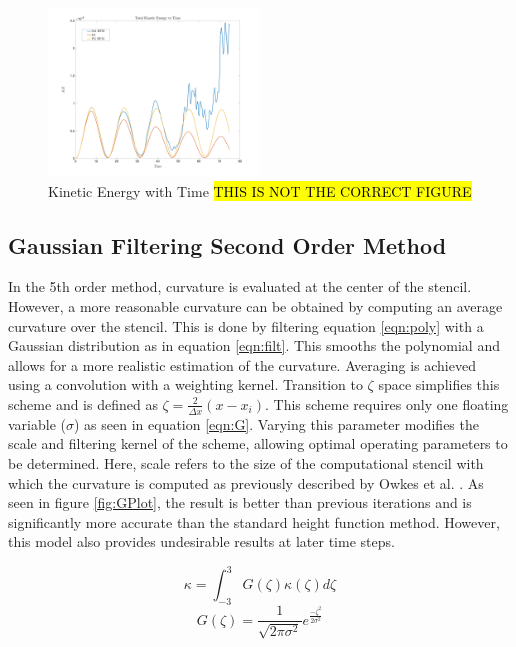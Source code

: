 \begin{figure}[h]
	\centering
	\includegraphics[width=0.5\textwidth]{figs/KEvT}
	\caption{Kinetic Energy with Time \hl{THIS IS NOT THE CORRECT FIGURE}}
	\label{fig:2ndKE}
\end{figure}


\subsection{Gaussian Filtering Second Order Method}

In the 5th order method, curvature is evaluated at the center of the stencil. However, a more reasonable curvature can be obtained by computing an average curvature over the stencil. This is done by filtering equation \ref{eqn:poly} with a Gaussian distribution as in equation \ref{eqn:filt}. This smooths the polynomial and allows for a more realistic estimation of the curvature. Averaging is achieved using a convolution with a weighting kernel. Transition to $\zeta$ space simplifies this scheme and is defined as $\zeta = \frac{2}{\Delta x}(x-x_i)$. This scheme requires only one floating variable ($\sigma$) as seen in equation \ref{eqn:G}. Varying this parameter modifies the scale and filtering kernel of the scheme, allowing optimal operating parameters to be determined. Here, scale refers to the size of the computational stencil with which the curvature is computed as previously described by Owkes et al. \cite{Owkes2018}. As seen in figure \ref{fig:GPlot}, the result is better than previous iterations and is significantly more accurate than the standard height function method. However, this model also provides undesirable results at later time steps.     

\vspace{-0.2in}
\begin{equation}
\kappa = \int_{-3}^{3} G(\zeta) \kappa(\zeta) d\zeta
\label{eqn:filt}
\end{equation} 
\begin{equation}
G(\zeta) = \frac{1}{\sqrt{2 \pi \sigma^2}}e^\frac{- \zeta^2}{2\sigma^2}
\label{eqn:G}
\end{equation} 

